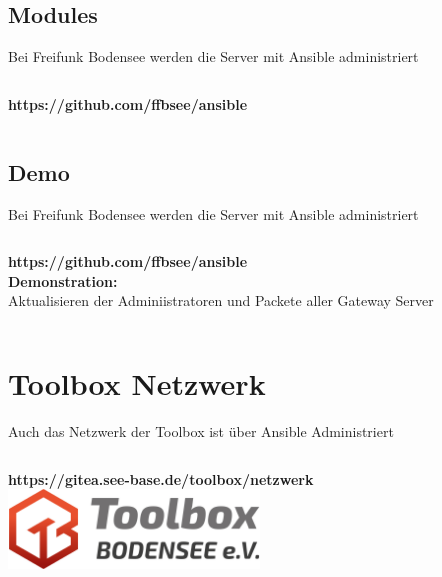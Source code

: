 \documentclass[aspectratio=169]{beamer}
\begin{document}
\subsection{Modules} 
\begin{frame}{Bei Freifunk Bodensee werden die Server mit Ansible administriert}
    \begin{columns}
        \begin{column}{1.0\textwidth}
            \centering
            \textbf{https://github.com/ffbsee/ansible} \\
            
        \end{column}
    \end{columns}
\end{frame}

\subsection{Demo} 
\begin{frame}{Bei Freifunk Bodensee werden die Server mit Ansible administriert}
    \begin{columns}
        \begin{column}{1.0\textwidth}
            \centering
            \textbf{https://github.com/ffbsee/ansible} \\
            \textbf{Demonstration:} \\
            Aktualisieren der Adminiistratoren und Packete aller Gateway Server \\
            
        \end{column}
    \end{columns}
\end{frame}

\section{Toolbox Netzwerk} 
\begin{frame}{Auch das Netzwerk der Toolbox ist über Ansible Administriert}
    \begin{columns}
        \begin{column}{1.0\textwidth}
            \centering
            \textbf{https://gitea.see-base.de/toolbox/netzwerk}
            \includegraphics[width=0.5\textwidth]{toolbox_300dpi.jpg}
        \end{column}
    \end{columns}
\end{frame}
\end{document}

